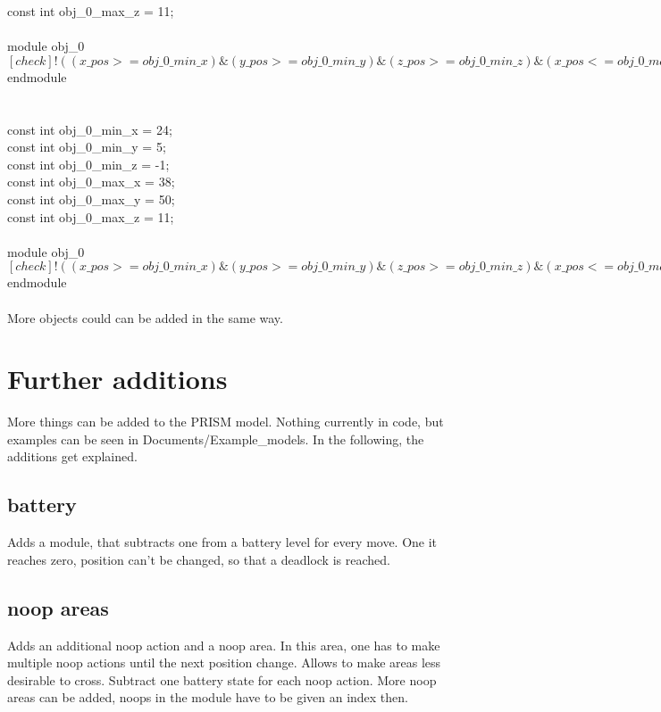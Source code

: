 \documentclass{article}
\begin{document}
const int obj\_0\_max\_z = 11;\\
\\
module obj\_0\\
$[check] !((x\_pos >= obj\_0\_min\_x) \& (y\_pos >= obj\_0\_min\_y) \& (z\_pos >= obj\_0\_min\_z) \& (x\_pos <= obj\_0\_max\_x) \& (y\_pos <= obj\_0\_max\_y) \& (z\_pos <= obj\_0\_max\_z)) -> true;$\\
endmodule\\
\\
\\   
const int obj\_0\_min\_x = 24;\\
const int obj\_0\_min\_y = 5;\\
const int obj\_0\_min\_z = -1;\\
const int obj\_0\_max\_x = 38;\\
const int obj\_0\_max\_y = 50;\\
const int obj\_0\_max\_z = 11;\\
\\
module obj\_0\\
$[check] !((x\_pos >= obj\_0\_min\_x) \& (y\_pos >= obj\_0\_min\_y) \& (z\_pos >= obj\_0\_min\_z) \& (x\_pos <= obj\_0\_max\_x) \& (y\_pos <= obj\_0\_max\_y)\ \& (z\_pos <= obj\_0\_max\_z)) -> true;$\\
endmodule\\
\\
More objects could can be added in the same way.\\

\section{Further additions}
More things can be added to the PRISM model. Nothing currently in code, but examples can be seen in Documents/Example\_models. In the following, the additions get explained.

\subsection{battery}
Adds a module, that subtracts one from a battery level for every move. One it reaches zero, position can't be changed, so that a deadlock is reached.

\subsection{noop areas}
Adds an additional noop action and a noop area. In this area, one has to make multiple noop actions until the next position change. Allows to make areas less desirable to cross. Subtract one battery state for each noop action. More noop areas can be added, noops in the module have to be given an index then.
\end{document}
